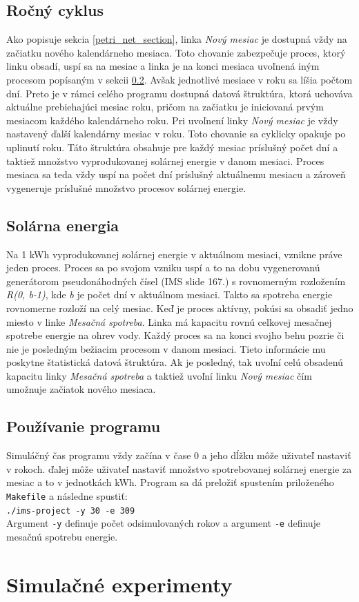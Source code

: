 \documentclass[a4paper, 11pt]{article}
\begin{document}
\subsection{Ročný cyklus}
Ako popisuje sekcia \ref{petri_net_section}, linka \textit{Nový mesiac} je dostupná vždy na začiatku nového kalendárneho mesiaca. Toto chovanie zabezpečuje proces, ktorý linku obsadí, uspí sa na mesiac a linka je na konci mesiaca uvoľnená iným procesom popísaným v sekcii \ref{solar_energy_proces}. Avšak jednotlivé mesiace v roku sa líšia počtom dní. Preto je v rámci celého programu dostupná datová štruktúra, ktorá uchováva aktuálne prebiehajúci mesiac roku, pričom na začiatku je iniciovaná prvým mesiacom každého kalendárneho roku. Pri uvoľnení linky \textit{Nový mesiac} je vždy nastavený ďalší kalendárny mesiac v roku. Toto chovanie sa cyklicky opakuje po uplinutí roku. Táto štruktúra obsahuje pre každý mesiac príslušný počet dní a taktiež množstvo vyprodukovanej solárnej energie v danom mesiaci. Proces mesiaca sa teda vždy uspí na počet dní príslušný aktuálnemu mesiacu a zároveň vygeneruje príslušné množstvo procesov solárnej energie.

\subsection{Solárna energia}\label{solar_energy_proces}
Na 1 kWh vyprodukovanej solárnej energie v aktuálnom mesiaci, vznikne práve jeden proces. Proces sa po svojom vzniku uspí a to na dobu vygenerovanú generátorom pseudonáhodných čísel (IMS\cite{ims_slides} slide 167.) s rovnomerným rozložením \textit{R(0, b-1)}, kde \textit{b} je počet dní v aktuálnom mesiaci. Takto sa spotreba energie rovnomerne rozloží na celý mesiac. Keď je proces aktívny, pokúsi sa obsadiť jedno miesto v linke \textit{Mesačná spotreba}. Linka má kapacitu rovnú celkovej mesačnej spotrebe energie na ohrev vody. Každý proces sa na konci svojho behu pozrie či nie je posledným bežiacim procesom v danom mesiaci. Tieto informácie mu poskytne štatistická datová štruktúra. Ak je posledný, tak uvoľní celú obsadenú kapacitu linky \textit{Mesačná spotreba} a taktiež uvoľní linku \textit{Nový mesiac} čím umožnuje začiatok nového mesiaca.

\subsection{Používanie programu}
Simuláčný čas programu vždy začína v čase 0 a jeho dĺžku môže uživateľ nastaviť v rokoch. ďalej môže uživateľ nastaviť množstvo spotrebovanej solárnej energie za mesiac a to v jednotkách kWh. Program sa dá preložiť spustením priloženého \texttt{Makefile} a následne spustiť:\\
\texttt{./ims-project -y 30 -e 309} \\
Argument \texttt{-y} definuje počet odsimulovaných rokov a argument \texttt{-e} definuje mesačnú spotrebu energie.

\section{Simulačné experimenty}

\newpage


\end{document}
